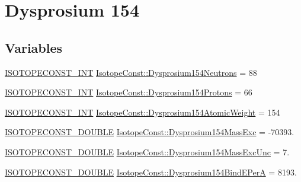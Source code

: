 \hypertarget{group___isotope_const-_dysprosium-_dy154}{}\section{Dysprosium 154}
\label{group___isotope_const-_dysprosium-_dy154}
\subsection*{Variables}
\begin{DoxyCompactItemize}
\item 
\mbox{\hyperlink{group___isotope_const-_macros_ga5f18360b3e99483a35c32d789e62621c}{I\+S\+O\+T\+O\+P\+E\+C\+O\+N\+S\+T\+\_\+\+I\+NT}} \mbox{\hyperlink{group___isotope_const-_dysprosium-_dy154_gac1fe5dbdf01c333a45f03cbe74e0dc80}{Isotope\+Const\+::\+Dysprosium154\+Neutrons}} = 88
\item 
\mbox{\hyperlink{group___isotope_const-_macros_ga5f18360b3e99483a35c32d789e62621c}{I\+S\+O\+T\+O\+P\+E\+C\+O\+N\+S\+T\+\_\+\+I\+NT}} \mbox{\hyperlink{group___isotope_const-_dysprosium-_dy154_ga3182cd69d6de480797db148f1d7bdf30}{Isotope\+Const\+::\+Dysprosium154\+Protons}} = 66
\item 
\mbox{\hyperlink{group___isotope_const-_macros_ga5f18360b3e99483a35c32d789e62621c}{I\+S\+O\+T\+O\+P\+E\+C\+O\+N\+S\+T\+\_\+\+I\+NT}} \mbox{\hyperlink{group___isotope_const-_dysprosium-_dy154_gab132237b90e4384d2280742eb65dddd6}{Isotope\+Const\+::\+Dysprosium154\+Atomic\+Weight}} = 154
\item 
\mbox{\hyperlink{group___isotope_const-_macros_ga8f45a7272ce02c0b4c65c44636ed719a}{I\+S\+O\+T\+O\+P\+E\+C\+O\+N\+S\+T\+\_\+\+D\+O\+U\+B\+LE}} \mbox{\hyperlink{group___isotope_const-_dysprosium-_dy154_ga3a855e9643764a72986e17992386e9bf}{Isotope\+Const\+::\+Dysprosium154\+Mass\+Exc}} = -\/70393.
\item 
\mbox{\hyperlink{group___isotope_const-_macros_ga8f45a7272ce02c0b4c65c44636ed719a}{I\+S\+O\+T\+O\+P\+E\+C\+O\+N\+S\+T\+\_\+\+D\+O\+U\+B\+LE}} \mbox{\hyperlink{group___isotope_const-_dysprosium-_dy154_ga88fe3926756ceee8beac33ae525f50a1}{Isotope\+Const\+::\+Dysprosium154\+Mass\+Exc\+Unc}} = 7.
\item 
\mbox{\hyperlink{group___isotope_const-_macros_ga8f45a7272ce02c0b4c65c44636ed719a}{I\+S\+O\+T\+O\+P\+E\+C\+O\+N\+S\+T\+\_\+\+D\+O\+U\+B\+LE}} \mbox{\hyperlink{group___isotope_const-_dysprosium-_dy154_ga5b463f6c2d6e927a70416c20b578b8e6}{Isotope\+Const\+::\+Dysprosium154\+Bind\+E\+PerA}} = 8193.

\end{DoxyCompactItemize}
